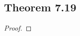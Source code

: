 \documentclass[../../main.tex]{subfiles}
\begin{document}
\subsection{Theorem 7.19}
\begin{wts}

\end{wts}
\begin{proof}

\end{proof}
\end{document}
